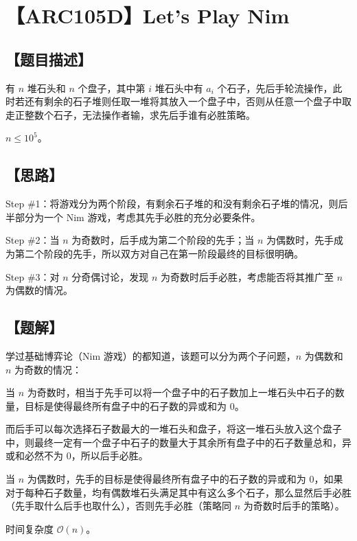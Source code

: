 \documentclass[UTF8,12pt,a4paper]{ctexart} %
\newcommand{\stress}[1]{\textbf{\CJKunderdot{#1}}}
\begin{document}
	\fontsize{12pt}{12pt}\selectfont
	
	\newpage
	\pagestyle{fancy}
	
	\section*{【ARC105D】Let's Play Nim}
	
	\subsection*{【题目描述】}
	
	有 $n$ 堆石头和 $n$ 个盘子，其中第 $i$ 堆石头中有 $a_i$ 个石子，先后手轮流操作，此时若还有剩余的石子堆则任取一堆将其\stress{全部}放入一个盘子中，否则从任意一个盘子中\stress{任意}取走正整数个石子，无法操作者输，求先后手谁有必胜策略。
	
	$n\le10^5$。
	
	\subsection*{【思路】}
	
	Step \#1：将游戏分为两个阶段，有剩余石子堆的和没有剩余石子堆的情况，则后半部分为一个 $\text{Nim}$ 游戏，考虑其先手必胜的充分必要条件。
	
	Step \#2：当 $n$ 为奇数时，后手成为第二个阶段的先手；当 $n$ 为偶数时，先手成为第二个阶段的先手，所以双方对自己在第一阶段最终的目标很明确。
	
	Step \#3：对 $n$ 分奇偶讨论，发现 $n$ 为奇数时后手必胜，考虑能否将其推广至 $n$ 为偶数的情况。
	
	\subsection*{【题解】}
	
	学过基础博弈论（Nim 游戏）的都知道，该题可以分为两个子问题，$n$ 为偶数和 $n$ 为奇数的情况：
	
	当 $n$ 为奇数时，相当于先手可以将一个盘子中的石子数加上一堆石头中石子的数量，目标是使得最终所有盘子中的石子数的异或和为 $0$。
	
	而后手可以每次选择石子数最大的一堆石头和盘子，将这一堆石头放入这个盘子中，则最终一定有一个盘子中石子的数量大于其余所有盘子中的石子数量总和，异或和必然不为 $0$，所以后手必胜。
	
	当 $n$ 为偶数时，先手的目标是使得最终所有盘子中的石子数的异或和\stress{不}为 $0$，如果对于每种石子数量，均有偶数堆石头满足其中有这么多个石子，那么显然后手必胜（先手取什么后手也取什么），否则先手必胜（策略同 $n$ 为奇数时后手的策略）。
	
	时间复杂度 $\mathcal{O}(n)$。
	
\end{document}
